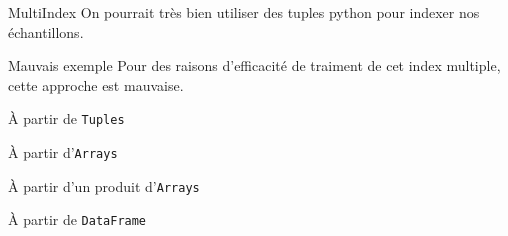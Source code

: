 \begin{frame}{MultiIndex}
    On pourrait très bien utiliser des tuples python pour indexer nos échantillons.
\end{frame}

\begin{frame}{Mauvais exemple}
    Pour des raisons d'efficacité de traiment de cet index multiple, cette approche est mauvaise.
\end{frame}
   
\begin{frame}{À partir de \texttt{Tuples}}
\end{frame}

\begin{frame}{À partir d'\texttt{Arrays}}
\end{frame}

\begin{frame}{À partir d'un produit d'\texttt{Arrays}}
\end{frame}

\begin{frame}{À partir de \texttt{DataFrame}}
\end{frame}

